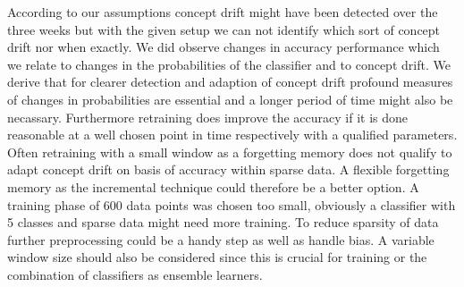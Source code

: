 \documentclass{article} %
\begin{document}
According to our assumptions concept drift might have been detected over the three weeks but with the given setup we can not identify which sort of concept drift nor when exactly. We did observe changes in accuracy performance which we relate to changes in the probabilities of the classifier and to concept drift. We derive that for clearer detection and adaption of concept drift profound measures of changes in probabilities are essential and a longer period of time might also be necassary. 
Furthermore retraining does improve the accuracy if it is done reasonable at a well chosen point in time respectively with a qualified parameters. Often retraining with a small window as a forgetting memory does not qualify to adapt concept drift on basis of accuracy within sparse data. 
A flexible forgetting memory as the incremental technique could therefore be a better option. A training phase of 600 data points was chosen too small, obviously a classifier with 5 classes and sparse data might need more training. To reduce sparsity of data further preprocessing could be a handy step as well as handle bias. A variable window size should also be considered since this is crucial for training or the combination of classifiers as ensemble learners. 





\small{

}
\end{document}
